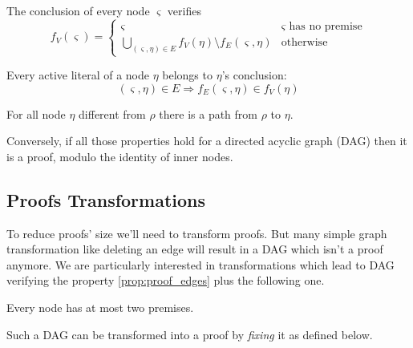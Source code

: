 \documentclass{llncs}
\begin{document}
\begin{property}
\label{prop:proof_conclusion}
The conclusion of every node $\varsigma$ verifies
\begin{equation*}
  f_V(\varsigma) = \begin{cases}
    \varsigma & \varsigma \text{ has no premise} \\
    \bigcup_{(\varsigma,\eta) \in E}{f_V(\eta) \setminus f_E(\varsigma,\eta)} & \text{otherwise}
  \end{cases}
\end{equation*}
\end{property}

\begin{property}
Every active literal of a node $\eta$ belongs to $\eta$'s conclusion:
\begin{equation*}
  (\varsigma,\eta) \in E \Rightarrow f_E(\varsigma,\eta) \in f_V(\eta)
\end{equation*}
\end{property}

\begin{property}
For all node $\eta$ different from $\rho$ there is a path from $\rho$ to $\eta$.
\end{property}

Conversely, if all those properties hold for a directed acyclic graph (DAG) then it is a proof,
modulo the identity of inner nodes.

\subsection{Proofs Transformations}

To reduce proofs' size we'll need to transform proofs. But many simple graph transformation like
deleting an edge will result in a DAG which isn't a proof anymore. We are particularly interested in
transformations which lead to DAG verifying the property \ref{prop:proof_edges} plus the following one.

\begin{property}
\label{prop:pseudo-proof}
Every node has at most two premises.
\end{property}

Such a DAG can be transformed into a proof by \emph{fixing} it as defined below.
\end{document}
